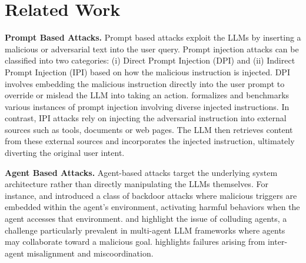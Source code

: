 \section{Related Work}
\textbf{Prompt Based Attacks.}
Prompt based attacks \citep{lee2024promptinfectionllmtollmprompt} exploit the LLMs by inserting a malicious or adversarial text into the user query. Prompt injection attacks \citep{liu2024promptinjectionattackllmintegrated} can be classified into two categories: (i) Direct Prompt Injection (DPI) and (ii) Indirect Prompt Injection (IPI) based on how the malicious instruction is injected. DPI involves embedding the malicious instruction directly into the user prompt to override or mislead the LLM into taking an action. \citet{ liu2024formalizingbenchmarkingpromptinjection} formalizes and benchmarks various instances of prompt injection involving diverse injected instructions. In contrast, IPI attacks \citep{zhan2024injecagentbenchmarkingindirectprompt, greshake2023youvesignedforcompromising, Yi_2025} rely on injecting the adversarial instruction into external sources such as tools, documents or web pages. The LLM then retrieves content from these external sources and incorporates the injected instruction, ultimately diverting the original user intent.  

\textbf{Agent Based Attacks.}
Agent-based attacks target the underlying system architecture rather than directly manipulating the LLMs themselves. For instance, \citet{wang2024badagentinsertingactivatingbackdoor} and \citet{Yang2024WatchOF} introduced a class of backdoor attacks where malicious triggers are embedded within the agent's environment, activating harmful behaviors when the agent accesses that environment. \citet{motwani2025secretcollusiongenerativeai} and \citet{wu2024shallteamupexploring} highlight the issue of colluding agents, a challenge particularly prevalent in multi-agent LLM frameworks where agents may collaborate toward a malicious goal. \cite{cemri2025multiagentllmsystemsfail} highlights failures arising from inter-agent misalignment and miscoordination.

